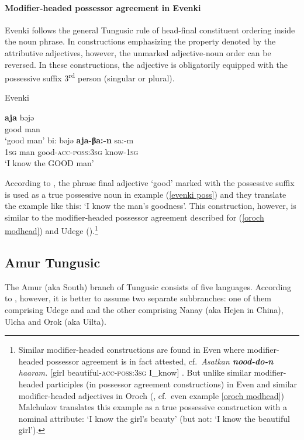 \paragraph{Modifier-headed possessor agreement in Evenki}
Evenki follows the general Tungusic rule of head-final constituent ordering inside the noun phrase. In constructions emphasizing the property denoted by the attributive adjectives, however, the unmarked adjective-noun order can be reversed. In these constructions, the adjective is obligatorily equipped with the possessive suffix 3\textsuperscript{rd} person (singular or plural).
\begin{exe}
\ex 
\rm{Evenki \citep[18]{bulatova-etal1999}}
\begin{xlist}
\ex	
\gll	\textbf{aja} bəjə\\
	good man\\
\glt	‘good man’
\ex \label{evenki poss}
\gll	bi: bəjə \textbf{aja-βa:-n} sa:-m\\
	\textsc{1sg} man good-\textsc{acc}-\textsc{poss:3sg} know-\textsc{1sg}\\
\glt	‘I know the GOOD man’
\end{xlist}
\end{exe}
According to \citet[18]{bulatova-etal1999}, the phrase final adjective ‘good’ marked with the possessive suffix is used as a true possessive noun in example (\ref{evenki poss}) and they translate the example like this: ‘I know the man's goodness’. This construction, however, is similar to the modifier-headed possessor agreement described for  (\ref{oroch modhead}) and Udege (\citealt[485, elsewhere]{nikolaeva-etal2001}).\footnote{Similar modifier-headed constructions are found in Even where modifier-headed possessor agreement is in fact attested, cf.~\textit{Asatkan \textbf{nood-do-n} haaram.} [girl beautiful-\textsc{acc}-\textsc{poss:3sg} I\_know] \citep[11]{malchukov1995}. But unlike similar modifier-headed participles (in possessor agreement constructions) in Even \citep[31]{malchukov1995} and similar modifier-headed adjectives in Oroch (\citealt{malchukov2000}, cf.~even example \ref{oroch modhead}) Malchukov translates this example as a true possessive construction with a nominal attribute: ‘I know the girl's beauty’ (but not: ‘I know the beautiful girl’).}

\subsection{Amur Tungusic}
The Amur (aka South) branch of Tungusic consists of five languages. According to \citet[223]{salminen2007}, however, it is better to assume two separate subbranches: one of them comprising Udege and  and the other comprising Nanay (aka Hejen in China), Ulcha and Orok (aka Uilta).

